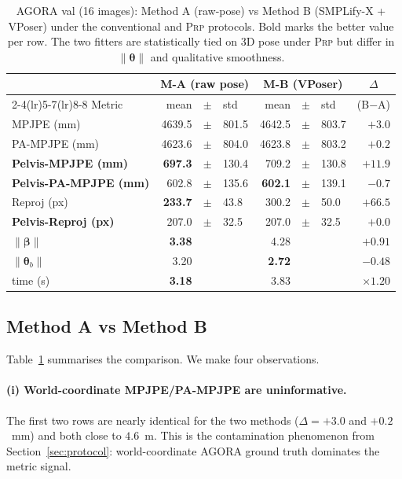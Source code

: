 \documentclass[twocolumn,10pt]{svjour3}
\newcommand{\methodA}{\textsc{M-A}}
\newcommand{\methodB}{\textsc{M-B}}
\newcommand{\prp}{\textsc{Prp}}
\begin{document}
\begin{table}[htbp]
\centering
\caption{AGORA val (16 images): Method A (raw-pose) vs Method B (SMPLify-X + VPoser) under the conventional and \prp{} protocols. Bold marks the better value per row. The two fitters are statistically tied on 3D pose under \prp{} but differ in $\|\boldsymbol{\theta}\|$ and qualitative smoothness.}
\label{tab:ab}
\begin{tabular}{l r@{\,}c@{\,}l r@{\,}c@{\,}l r}
\toprule
& \multicolumn{3}{c}{\methodA{} (raw pose)} & \multicolumn{3}{c}{\methodB{} (VPoser)} & \multicolumn{1}{c}{$\Delta$}\\
\cmidrule(lr){2-4}\cmidrule(lr){5-7}\cmidrule(lr){8-8}
Metric                                  & mean & $\pm$ & std & mean & $\pm$ & std & (B$-$A)\\
\midrule
MPJPE (mm)                              & 4639.5 & $\pm$ & 801.5 & 4642.5 & $\pm$ & 803.7 & $+3.0$\\
PA-MPJPE (mm)                           & 4623.6 & $\pm$ & 804.0 & 4623.8 & $\pm$ & 803.2 & $+0.2$\\
\textbf{Pelvis-MPJPE (mm)}              & \textbf{697.3} & $\pm$ & 130.4 & 709.2 & $\pm$ & 130.8 & $+11.9$\\
\textbf{Pelvis-PA-MPJPE (mm)}           & 602.8 & $\pm$ & 135.6 & \textbf{602.1} & $\pm$ & 139.1 & $\mathbf{-0.7}$\\
Reproj (px)                             & \textbf{233.7} & $\pm$ & 43.8  & 300.2 & $\pm$ & 50.0 & $+66.5$\\
\textbf{Pelvis-Reproj (px)}             & 207.0 & $\pm$ & 32.5  & 207.0 & $\pm$ & 32.5 & $+0.0$\\
\midrule
$\|\boldsymbol{\beta}\|$                  & \textbf{3.38} & & & 4.28 & & & $+0.91$\\
$\|\boldsymbol{\theta}_b\|$               & 3.20 & & & \textbf{2.72} & & & $\mathbf{-0.48}$\\
time (s)                                & \textbf{3.18} & & & 3.83 & & & $\times1.20$\\
\bottomrule
\end{tabular}
\end{table}

\subsection{Method A vs Method B}
Table~\ref{tab:ab} summarises the comparison. We make four observations.

\paragraph{(i) World-coordinate MPJPE/PA-MPJPE are uninformative.}
The first two rows are nearly identical for the two methods ($\Delta = +3.0$ and $+0.2$~mm) and both close to $4.6$~m. This is the contamination phenomenon from Section~\ref{sec:protocol}: world-coordinate AGORA ground truth dominates the metric signal.
\end{document}
